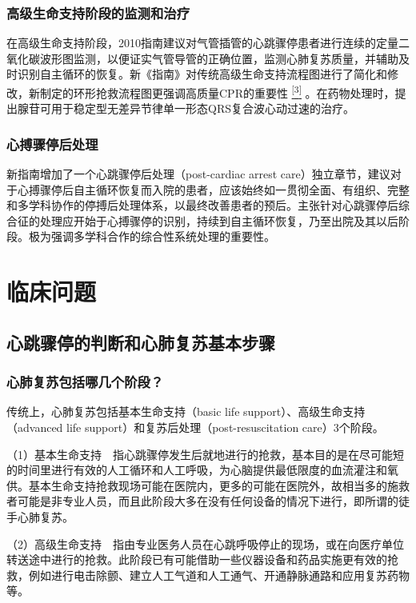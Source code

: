 \subsubsection{高级生命支持阶段的监测和治疗}

在高级生命支持阶段，2010指南建议对气管插管的心跳骤停患者进行连续的定量二氧化碳波形图监测，以便证实气管导管的正确位置，监测心肺复苏质量，并辅助及时识别自主循环的恢复。新《指南》对传统高级生命支持流程图进行了简化和修改，新制定的环形抢救流程图更强调高质量CPR的重要性
\protect\hyperlink{text00023.htmlux5cux23ch3-22}{\textsuperscript{{[}3{]}}}
。在药物处理时，提出腺苷可用于稳定型无差异节律单一形态QRS复合波心动过速的治疗。

\subsubsection{心搏骤停后处理}

新指南增加了一个心跳骤停后处理（post-cardiac arrest
care）独立章节，建议对于心搏骤停后自主循环恢复而入院的患者，应该始终如一贯彻全面、有组织、完整和多学科协作的停搏后处理体系，以最终改善患者的预后。主张针对心跳骤停后综合征的处理应开始于心搏骤停的识别，持续到自主循环恢复，乃至出院及其以后阶段。极为强调多学科合作的综合性系统处理的重要性。

\section{临床问题}

\subsection{心跳骤停的判断和心肺复苏基本步骤}

\subsubsection{心肺复苏包括哪几个阶段？}

传统上，心肺复苏包括基本生命支持（basic life
support）、高级生命支持（advanced life
support）和复苏后处理（post-resuscitation care）3个阶段。

（1）基本生命支持　指心跳骤停发生后就地进行的抢救，基本目的是在尽可能短的时间里进行有效的人工循环和人工呼吸，为心脑提供最低限度的血流灌注和氧供。基本生命支持抢救现场可能在医院内，更多的可能在医院外，故相当多的施救者可能是非专业人员，而且此阶段大多在没有任何设备的情况下进行，即所谓的徒手心肺复苏。

（2）高级生命支持　指由专业医务人员在心跳呼吸停止的现场，或在向医疗单位转送途中进行的抢救。此阶段已有可能借助一些仪器设备和药品实施更有效的抢救，例如进行电击除颤、建立人工气道和人工通气、开通静脉通路和应用复苏药物等。

